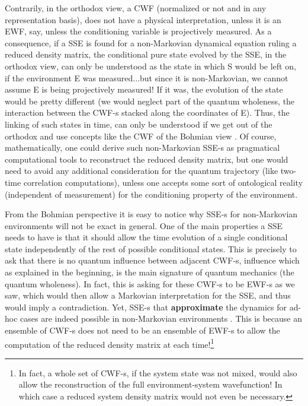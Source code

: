 \documentclass[11pt, a4paper]{article} %
\begin{document}
Contrarily, in the orthodox view, a CWF (normalized or not and in any representation basis), does not have a physical interpretation, unless it is an EWF, say, unless the conditioning variable is projectively measured. As a consequence, if a SSE is found for a non-Markovian dynamical equation ruling a reduced density matrix, the conditional pure state evolved by the SSE, in the orthodox view, can only be understood as the state in which S would be left on, if the environment E was measured...but since it is non-Markovian, we cannot assume E is being projectively measured! If it was, the evolution of the state would be pretty different (we would neglect part of the quantum wholeness, the interaction between the CWF-s stacked along the coordinates of E). Thus, the linking of such states in time, can only be understood if we get out of the orthodox and use concepts like the CWF of the Bohmian view \cite{NMisModal, interpretSSE}. Of course, mathematically, one could derive such non-Markovian SSE-s as pragmatical computational tools to reconstruct the reduced density matrix, but one would need to avoid any additional consideration for the quantum trajectory (like two-time correlation computations), unless one accepts some sort of ontological reality (independent of measurement) for the conditioning property of the environment.

From the Bohmian perspective it is easy to notice why SSE-s for non-Markovian environments will not be exact in general. One of the main properties a SSE needs to have is that it should allow the time evolution of a single conditional state independently of the rest of possible conditional states. This is precisely to ask that there is no quantum influence between adjacent CWF-s, influence which as explained in the beginning, is the main signature of quantum mechanics (the quantum wholeness). In fact, this is asking for these CWF-s to be EWF-s as we saw, which would then allow a Markovian interpretation for the SSE, and thus would imply a contradiction. Yet, SSE-s that {\bf approximate} the dynamics for ad-hoc cases are indeed possible in non-Markovian environments \cite{ Diosi, WisemanSSE, Thz}. This is because an ensemble of CWF-s does not need to be an ensemble of EWF-s to allow the computation of the reduced density matrix at each time!\footnote{In fact, a whole set of CWF-s, if the system state was not mixed, would also allow the reconstruction of the full environment-system wavefunction! In which case a reduced system density matrix would not even be necessary.} 
\end{document}
